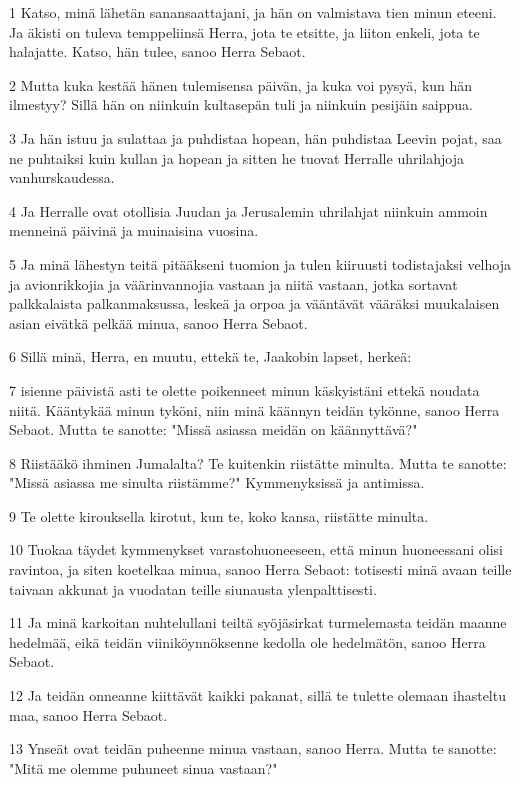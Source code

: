 \par 1 Katso, minä lähetän sanansaattajani, ja hän on valmistava tien minun eteeni. Ja äkisti on tuleva temppeliinsä Herra, jota te etsitte, ja liiton enkeli, jota te halajatte. Katso, hän tulee, sanoo Herra Sebaot.
\par 2 Mutta kuka kestää hänen tulemisensa päivän, ja kuka voi pysyä, kun hän ilmestyy? Sillä hän on niinkuin kultasepän tuli ja niinkuin pesijäin saippua.
\par 3 Ja hän istuu ja sulattaa ja puhdistaa hopean, hän puhdistaa Leevin pojat, saa ne puhtaiksi kuin kullan ja hopean ja sitten he tuovat Herralle uhrilahjoja vanhurskaudessa.
\par 4 Ja Herralle ovat otollisia Juudan ja Jerusalemin uhrilahjat niinkuin ammoin menneinä päivinä ja muinaisina vuosina.
\par 5 Ja minä lähestyn teitä pitääkseni tuomion ja tulen kiiruusti todistajaksi velhoja ja avionrikkojia ja väärinvannojia vastaan ja niitä vastaan, jotka sortavat palkkalaista palkanmaksussa, leskeä ja orpoa ja vääntävät vääräksi muukalaisen asian eivätkä pelkää minua, sanoo Herra Sebaot.
\par 6 Sillä minä, Herra, en muutu, ettekä te, Jaakobin lapset, herkeä:
\par 7 isienne päivistä asti te olette poikenneet minun käskyistäni ettekä noudata niitä. Kääntykää minun tyköni, niin minä käännyn teidän tykönne, sanoo Herra Sebaot. Mutta te sanotte: "Missä asiassa meidän on käännyttävä?"
\par 8 Riistääkö ihminen Jumalalta? Te kuitenkin riistätte minulta. Mutta te sanotte: "Missä asiassa me sinulta riistämme?" Kymmenyksissä ja antimissa.
\par 9 Te olette kirouksella kirotut, kun te, koko kansa, riistätte minulta.
\par 10 Tuokaa täydet kymmenykset varastohuoneeseen, että minun huoneessani olisi ravintoa, ja siten koetelkaa minua, sanoo Herra Sebaot: totisesti minä avaan teille taivaan akkunat ja vuodatan teille siunausta ylenpalttisesti.
\par 11 Ja minä karkoitan nuhtelullani teiltä syöjäsirkat turmelemasta teidän maanne hedelmää, eikä teidän viiniköynnöksenne kedolla ole hedelmätön, sanoo Herra Sebaot.
\par 12 Ja teidän onneanne kiittävät kaikki pakanat, sillä te tulette olemaan ihasteltu maa, sanoo Herra Sebaot.
\par 13 Ynseät ovat teidän puheenne minua vastaan, sanoo Herra. Mutta te sanotte: "Mitä me olemme puhuneet sinua vastaan?"
